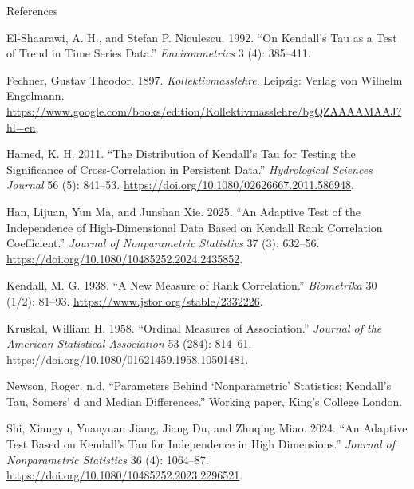 \documentclass[
  ignorenonframetext,
]{beamer}
\newlength{\cslhangindent}
\newenvironment{CSLReferences}[2] %
 {\begin{list}{}{%
  \setlength{\itemindent}{0pt}
  \setlength{\leftmargin}{0pt}
  \setlength{\parsep}{0pt}
  \ifodd #1
   \setlength{\leftmargin}{\cslhangindent}
   \setlength{\itemindent}{-1\cslhangindent}
  \fi
  \setlength{\itemsep}{#2\baselineskip}}}
 {\end{list}}
\begin{document}
\begin{frame}[allowframebreaks]{References}
\label{references}
\scriptsize

\label{refs}
\begin{CSLReferences}{1}{0}
El-Shaarawi, A. H., and Stefan P. Niculescu. 1992. {``On Kendall's Tau
as a Test of Trend in Time Series Data.''} \emph{Environmetrics} 3 (4):
385--411.

Fechner, Gustav Theodor. 1897. \emph{Kollektivmasslehre}. Leipzig:
Verlag von Wilhelm Engelmann.
\url{https://www.google.com/books/edition/Kollektivmasslehre/bgQZAAAAMAAJ?hl=en}.

Hamed, K. H. 2011. {``The Distribution of Kendall's Tau for Testing the
Significance of Cross-Correlation in Persistent Data.''}
\emph{Hydrological Sciences Journal} 56 (5): 841--53.
\url{https://doi.org/10.1080/02626667.2011.586948}.

Han, Lijuan, Yun Ma, and Junshan Xie. 2025. {``An Adaptive Test of the
Independence of High-Dimensional Data Based on Kendall Rank Correlation
Coefficient.''} \emph{Journal of Nonparametric Statistics} 37 (3):
632--56. \url{https://doi.org/10.1080/10485252.2024.2435852}.

Kendall, M. G. 1938. {``A New Measure of Rank Correlation.''}
\emph{Biometrika} 30 (1/2): 81--93.
\url{https://www.jstor.org/stable/2332226}.

Kruskal, William H. 1958. {``Ordinal Measures of Association.''}
\emph{Journal of the American Statistical Association} 53 (284):
814--61. \url{https://doi.org/10.1080/01621459.1958.10501481}.

Newson, Roger. n.d. {``Parameters Behind {`Nonparametric'} Statistics:
Kendall's Tau, Somers' d and Median Differences.''} Working paper,
King's College London.

Shi, Xiangyu, Yuanyuan Jiang, Jiang Du, and Zhuqing Miao. 2024. {``An
Adaptive Test Based on Kendall's Tau for Independence in High
Dimensions.''} \emph{Journal of Nonparametric Statistics} 36 (4):
1064--87. \url{https://doi.org/10.1080/10485252.2023.2296521}.

\end{CSLReferences}
\end{frame}
\end{document}
